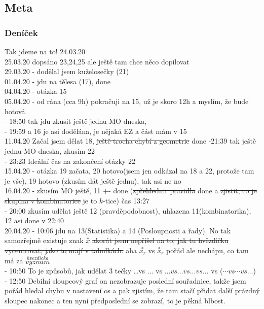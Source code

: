 \documentclass[12pt]{article}
\begin{document}
\rightline{\today}

\subsection{Meta}
\subsubsection{Deníček}
Tak jdeme na to! 24.03.20\\
25.03.20 dopsáno 23,24,25 ale ještě tam chce něco dopilovat\\
29.03.20 - dodělal jsem kuželosečky (21)\\
01.04.20 - jdu na tělesa (17), done\\
04.04.20 - otázka 15\\
05.04.20 - od rána (cca 9h) pokračuji na 15, už je skoro 12h a myslím, že bude hotová.\\
 - 18:50 tak jdu zkusit ještě jednu MO dneska,\\
 - 19:59 a 16 je asi dodělána, je nějaká EZ a část mám v 15\\
11.04.20 Začal jsem dělat 18, \st{ještě trocha chybí z geometrie} done
-21:39 tak ještě jednu MO dneska, zkusím 22\\
- 23:23 Ideální čas na zakončení otázky 22\\
15.04.20 - otázka 19 začata, 20 hotovo(jsem jen odkázal na 18 a 22, protože tam je vše), 19 hotovo (zkusím dát ještě jednu), tak asi ne no\\
16.04.20 - zkusím MO ještě, 11 +- done (\st{zpřehlednit pravidla} done a \st{zjistit, co je skupina v kombinatorice} je to $k$-tice) čas 13:27\\
- 20:00 zkusím udělat ještě 12 (pravděpodobnost), uhlazena 11(kombinatorika), 12 asi done v 22:40\\
20.04.20 - 10:06 jdu na 13(Statistika) a 14 (Posloupnosti a řady). No tak samozřejmě existuje znak $\overset{*}{x}$ \st{ akorát jsem nepřišel na to, jak tu hvězdičku vycentrovat, jako to mají v tabulkách.} aha $\overset{*}{x_r}$ vs $\overset{*}{x}_r$ pořád ale  nechápu, co tam má za $ \overset{hvezdicka}{vyznam}$\\
 - 10:50 To je způsobů, jak udělat 3 tečky \dots vs ... vs $ \dots vs \ldots vs \dotsc vs ...$ vs ($\dotsm vs \dotsb vs \dotso $)\\
 - 12:50 Debilní sloupcový graf on nezobrazuje poslední souřadnice, takže jsem pořád hledal chybu v nastavení os a pak zjistím, že tam stačí přidat další prázdný sloupec nakonec a ten nyní předposlední se zobrazí, to je pěkná blbost.\\
\end{document}
